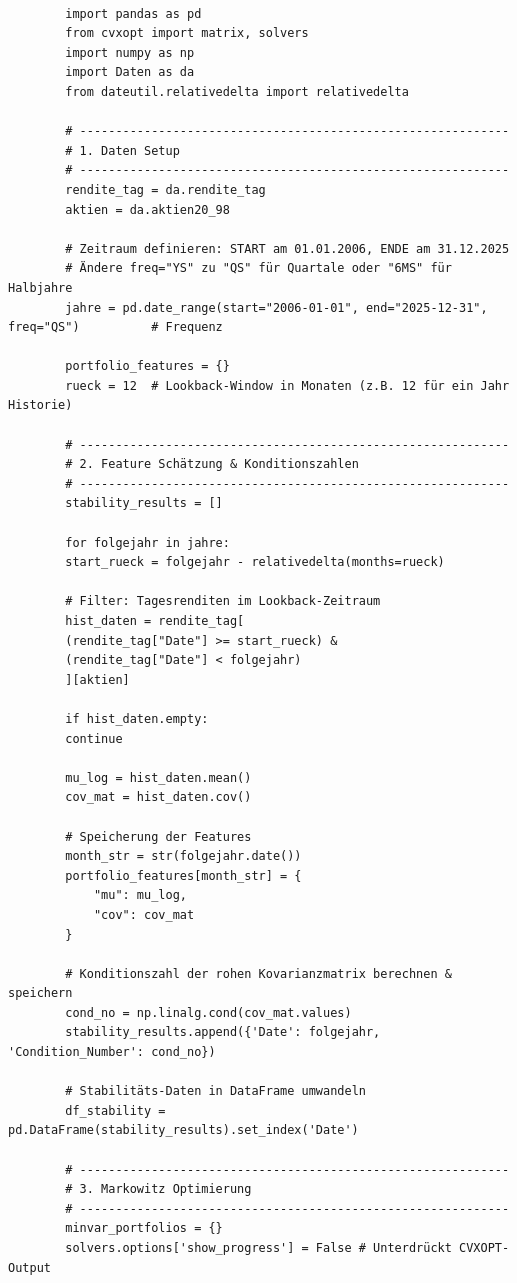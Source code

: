 \documentclass[parskip=half]{scrartcl}
\begin{document}
	\begin{lstlisting}[caption={Markowitz-Optimierung}, label={lst:mark_code}]
		
		import pandas as pd 
		from cvxopt import matrix, solvers 
		import numpy as np 
		import Daten as da 
		from dateutil.relativedelta import relativedelta 
		
		# ------------------------------------------------------------ 
		# 1. Daten Setup 
		# ------------------------------------------------------------ 
		rendite_tag = da.rendite_tag 
		aktien = da.aktien20_98 
		
		# Zeitraum definieren: START am 01.01.2006, ENDE am 31.12.2025
		# Ändere freq="YS" zu "QS" für Quartale oder "6MS" für Halbjahre
		jahre = pd.date_range(start="2006-01-01", end="2025-12-31", freq="QS")          # Frequenz 
		
		portfolio_features = {} 
		rueck = 12  # Lookback-Window in Monaten (z.B. 12 für ein Jahr Historie)
		
		# ------------------------------------------------------------ 
		# 2. Feature Schätzung & Konditionszahlen 
		# ------------------------------------------------------------ 
		stability_results = [] 
		
		for folgejahr in jahre: 
		start_rueck = folgejahr - relativedelta(months=rueck) 
		
		# Filter: Tagesrenditen im Lookback-Zeitraum
		hist_daten = rendite_tag[ 
		(rendite_tag["Date"] >= start_rueck) &  
		(rendite_tag["Date"] < folgejahr) 
		][aktien] 
		
		if hist_daten.empty: 
		continue 
		
		mu_log = hist_daten.mean() 
		cov_mat = hist_daten.cov() 
		
		# Speicherung der Features 
		month_str = str(folgejahr.date()) 
		portfolio_features[month_str] = { 
			"mu": mu_log, 
			"cov": cov_mat 
		} 
		
		# Konditionszahl der rohen Kovarianzmatrix berechnen & speichern 
		cond_no = np.linalg.cond(cov_mat.values) 
		stability_results.append({'Date': folgejahr, 'Condition_Number': cond_no}) 
		
		# Stabilitäts-Daten in DataFrame umwandeln 
		df_stability = pd.DataFrame(stability_results).set_index('Date') 
		
		# ------------------------------------------------------------ 
		# 3. Markowitz Optimierung
		# ------------------------------------------------------------ 
		minvar_portfolios = {} 
		solvers.options['show_progress'] = False # Unterdrückt CVXOPT-Output
		

\end{lstlisting}
\end{document}
